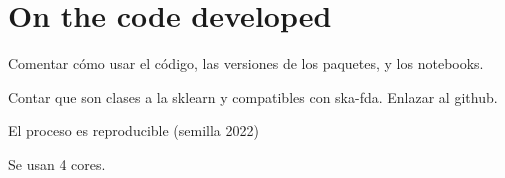 %
%

\chapter{On the code developed}\label{ch:code}

\begin{outcomment}
  Comentar cómo usar el código, las versiones de los paquetes, y los notebooks.

  Contar que son clases a la sklearn y compatibles con ska-fda. Enlazar al github.

  El proceso es reproducible (semilla 2022)

  Se usan 4 cores.

\end{outcomment}
